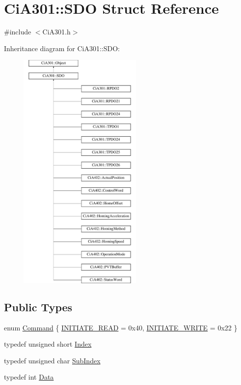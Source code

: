 \hypertarget{struct_ci_a301_1_1_s_d_o}{\section{Ci\-A301\-:\-:S\-D\-O Struct Reference}
\label{struct_ci_a301_1_1_s_d_o}
}


{\ttfamily \#include $<$Ci\-A301.\-h$>$}

Inheritance diagram for Ci\-A301\-:\-:S\-D\-O\-:\begin{figure}[H]
\begin{center}
\leavevmode
\includegraphics[height=12.000000cm]{d5/d30/struct_ci_a301_1_1_s_d_o}
\end{center}
\end{figure}
\subsection*{Public Types}
\begin{DoxyCompactItemize}
\item 
enum \hyperlink{struct_ci_a301_1_1_s_d_o_a775f3ad0c6ad9894efd23092a37906ea}{Command} \{ \hyperlink{struct_ci_a301_1_1_s_d_o_a775f3ad0c6ad9894efd23092a37906eaae876c1cc1f0e9852492ba555cd5149db}{I\-N\-I\-T\-I\-A\-T\-E\-\_\-\-R\-E\-A\-D} = 0x40, 
\hyperlink{struct_ci_a301_1_1_s_d_o_a775f3ad0c6ad9894efd23092a37906eaac1a6618eed7bcf60cdad6a5acd583d6e}{I\-N\-I\-T\-I\-A\-T\-E\-\_\-\-W\-R\-I\-T\-E} = 0x22
 \}
\item 
typedef unsigned short \hyperlink{struct_ci_a301_1_1_s_d_o_a23ec0bef652b1fad0123ec3bed770852}{Index}
\item 
typedef unsigned char \hyperlink{struct_ci_a301_1_1_s_d_o_add21496adb09c6f74c8f725c17ec116a}{Sub\-Index}
\item 
typedef int \hyperlink{struct_ci_a301_1_1_s_d_o_a8224c82a3130510d9cdb8ae739de624b}{Data}
\end{DoxyCompactItemize}
